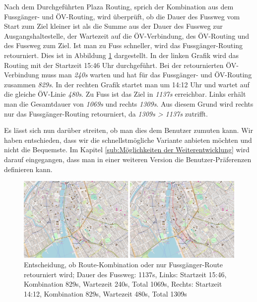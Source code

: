 Nach dem Durchgeführten Plaza Routing, sprich der Kombination aus dem Fussgänger- und ÖV-Routing, wird überprüft, ob die Dauer des Fussweg vom Start zum Ziel kleiner ist als die Summe aus der Dauer des Fussweg zur Ausgangshaltestelle, der Wartezeit auf die ÖV-Verbindung, des ÖV-Routing und des Fussweg zum Ziel. Ist man zu Fuss schneller, wird das Fussgänger-Routing retourniert. Dies ist in Abbildung \ref{fig:qgis_plugin_plaza_route_walking_public_transport_comparison} dargestellt. In der linken Grafik wird das Routing mit der Startzeit 15:46 Uhr durchgeführt. Bei der retournierten ÖV-Verbindung muss man \emph{240s} warten und hat für das Fussgänger- und ÖV-Routing zusammen \emph{829s}.
In der rechten Grafik startet man um 14:12 Uhr und wartet auf die gleiche ÖV-Linie \emph{480s}. Zu Fuss ist das Ziel in \emph{1137s} erreichbar. Links erhält man die Gesamtdauer von \emph{1069s} und rechts \emph{1309s}.
Aus diesem Grund wird rechts nur das Fussgänger-Routing retourniert, da \emph{1309s > 1137s} zutrifft.

Es lässt sich nun darüber streiten, ob man dies dem Benutzer zumuten kann. Wir haben entschieden, dass wir die schnellstmögliche Variante anbieten möchten und nicht die Bequemste.
Im Kapitel \ref{sub:Möglichkeiten der Weiterentwicklung} wird darauf eingegangen, dass man in einer weiteren Version die Benutzer-Präferenzen definieren kann.

\begin{figure}[ht]
    \centering
    \includegraphics[width=1.0\linewidth]{projectdoc/img/qgis_plugin_plaza_route_walking_public_transport_comparison}
    \caption[Entscheidung, ob Route-Kombination oder nur Fussgänger-Route retourniert wird]{Entscheidung, ob Route-Kombination oder nur Fussgänger-Route retourniert wird; Dauer des Fussweg: 1137s, Links: Startzeit 15:46, Kombination 829s, Wartezeit 240s, Total 1069s, Rechts: Startzeit 14:12, Kombination 829s, Wartezeit 480s, Total 1309s}
    \label{fig:qgis_plugin_plaza_route_walking_public_transport_comparison}
\end{figure}

